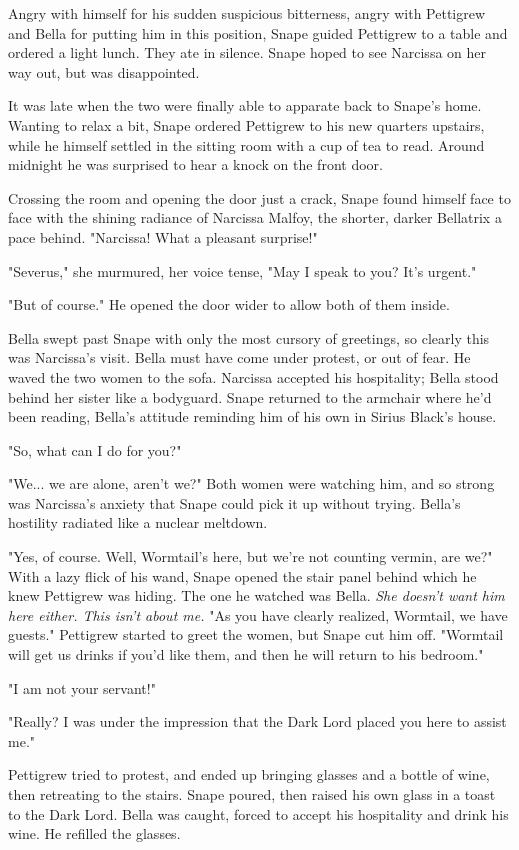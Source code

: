 \documentclass[a4paper,11pt]{article}
\begin{document}
Angry with himself for his sudden suspicious bitterness, angry with Pettigrew and Bella for putting him in this position, Snape guided Pettigrew to a table and ordered a light lunch. They ate in silence. Snape hoped to see Narcissa on her way out, but was disappointed.

It was late when the two were finally able to apparate back to Snape's home. Wanting to relax a bit, Snape ordered Pettigrew to his new quarters upstairs, while he himself settled in the sitting room with a cup of tea to read. Around midnight he was surprised to hear a knock on the front door.

Crossing the room and opening the door just a crack, Snape found himself face to face with the shining radiance of Narcissa Malfoy, the shorter, darker Bellatrix a pace behind. "Narcissa! What a pleasant surprise!"

"Severus," she murmured, her voice tense, "May I speak to you? It's urgent."

"But of course." He opened the door wider to allow both of them inside.

Bella swept past Snape with only the most cursory of greetings, so clearly this was Narcissa's visit. Bella must have come under protest, or out of fear. He waved the two women to the sofa. Narcissa accepted his hospitality; Bella stood behind her sister like a bodyguard. Snape returned to the armchair where he'd been reading, Bella's attitude reminding him of his own in Sirius Black's house.

"So, what can I do for you?"

"We... we are alone, aren't we?" Both women were watching him, and so strong was Narcissa's anxiety that Snape could pick it up without trying. Bella's hostility radiated like a nuclear meltdown.

"Yes, of course. Well, Wormtail's here, but we're not counting vermin, are we?" With a lazy flick of his wand, Snape opened the stair panel behind which he knew Pettigrew was hiding. The one he watched was Bella. \emph{She doesn't want him here either. This isn't about me.} "As you have clearly realized, Wormtail, we have guests." Pettigrew started to greet the women, but Snape cut him off. "Wormtail will get us drinks if you'd like them, and then he will return to his bedroom."

"I am not your servant!"

"Really? I was under the impression that the Dark Lord placed you here to assist me."

Pettigrew tried to protest, and ended up bringing glasses and a bottle of wine, then retreating to the stairs. Snape poured, then raised his own glass in a toast to the Dark Lord. Bella was caught, forced to accept his hospitality and drink his wine. He refilled the glasses.
\end{document}
